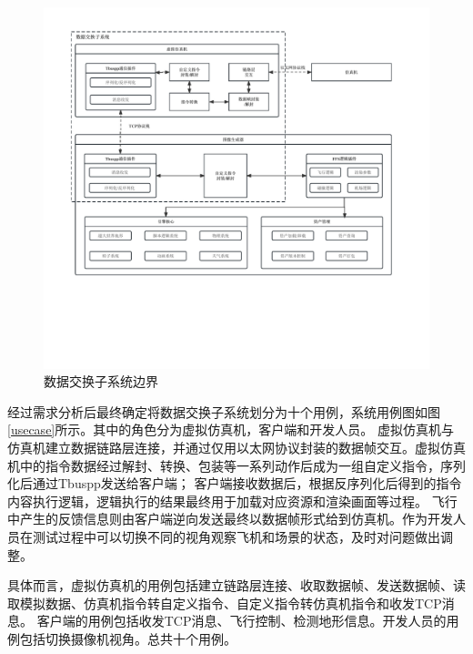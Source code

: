 \begin{figure}[h]
    \begin{center}
        \includegraphics[width=\textwidth]{pictures/sysedge.pdf}
        \caption{数据交换子系统边界}
        \label{framework}
    \end{center}
\end{figure}
经过需求分析后最终确定将数据交换子系统划分为十个用例，系统用例图如图\ref{usecase}所示。其中的角色分为虚拟仿真机，客户端和开发人员。
虚拟仿真机与仿真机建立数据链路层连接，并通过仅用以太网协议封装的数据帧交互。虚拟仿真机中的指令数据经过解封、转换、包装等一系列动作后成为一组自定义指令，序列化后通过Tbuspp发送给客户端；
客户端接收数据后，根据反序列化后得到的指令内容执行逻辑，逻辑执行的结果最终用于加载对应资源和渲染画面等过程。
飞行中产生的反馈信息则由客户端逆向发送最终以数据帧形式给到仿真机。作为开发人员在测试过程中可以切换不同的视角观察飞机和场景的状态，及时对问题做出调整。
\par
具体而言，虚拟仿真机的用例包括建立链路层连接、收取数据帧、发送数据帧、读取模拟数据、仿真机指令转自定义指令、自定义指令转仿真机指令和收发TCP消息。
客户端的用例包括收发TCP消息、飞行控制、检测地形信息。开发人员的用例包括切换摄像机视角。总共十个用例。

